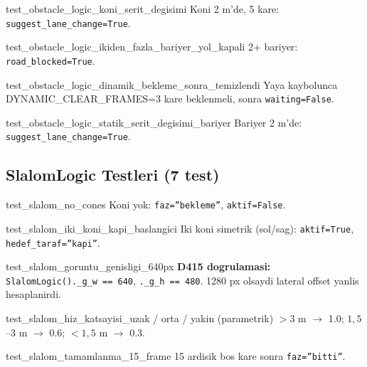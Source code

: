 \documentclass[a4paper,12pt]{article}
\begin{document}
\begin{testbox}{test\_obstacle\_logic\_koni\_serit\_degisimi}
Koni 2 m'de, 5 kare: \texttt{suggest\_lane\_change=True}.
\end{testbox}

\begin{testbox}{test\_obstacle\_logic\_ikiden\_fazla\_bariyer\_yol\_kapali}
2+ bariyer: \texttt{road\_blocked=True}.
\end{testbox}

\begin{testbox}{test\_obstacle\_logic\_dinamik\_bekleme\_sonra\_temizlendi}
Yaya kaybolunca DYNAMIC\_CLEAR\_FRAMES=3 kare beklenmeli, sonra
\texttt{waiting=False}.
\end{testbox}

\begin{testbox}{test\_obstacle\_logic\_statik\_serit\_degisimi\_bariyer}
Bariyer 2 m'de: \texttt{suggest\_lane\_change=True}.
\end{testbox}

\subsection{SlalomLogic Testleri (7 test)}

\begin{testbox}{test\_slalom\_no\_cones}
Koni yok: \texttt{faz=''bekleme''}, \texttt{aktif=False}.
\end{testbox}

\begin{testbox}{test\_slalom\_iki\_koni\_kapi\_baslangici}
Iki koni simetrik (sol/sag): \texttt{aktif=True},
\texttt{hedef\_taraf=''kapi''}.
\end{testbox}

\begin{testbox}{test\_slalom\_goruntu\_genisligi\_640px}
\textbf{D415 dogrulamasi:} \texttt{SlalomLogic().\_g\_w == 640},
\texttt{.\_g\_h == 480}. 1280 px olsaydi lateral offset yanlis hesaplanirdi.
\end{testbox}

\begin{testbox}{test\_slalom\_hiz\_katsayisi\_uzak / orta / yakin (parametrik)}
$> 3$ m $\to$ 1.0; $1{,}5$--$3$ m $\to$ 0.6; $< 1{,}5$ m $\to$ 0.3.
\end{testbox}

\begin{testbox}{test\_slalom\_tamamlanma\_15\_frame}
15 ardisik bos kare sonra \texttt{faz=''bitti''}.
\end{testbox}
\end{document}

